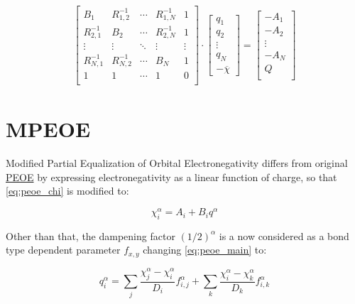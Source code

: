\documentclass[oneside]{memoir}
\newcommand\ddfrac[2]{\frac{\displaystyle #1}{\displaystyle #2}}
\begin{document}
\begin{gather}
	\label{eq:eem_system}
	\begin{bmatrix}
		B_1			    & R_{1,2}^{-1}  & \cdots	& R_{1,N}^{-1}	& 1 \\
		R_{2,1}^{-1}	& B_2			& \cdots	& R_{2,N}^{-1}	& 1 \\
		\vdots			& \vdots		& \ddots	& \vdots		& \vdots \\
		R_{N,1}^{-1}	& R_{N,2}^{-1}	& \cdots	& B_N			& 1 \\
		1			    & 1		    	& \cdots	& 1		    	& 0 \\
	\end{bmatrix}
	\cdot
	\begin{bmatrix}
		q_1 \\
		q_2 \\
		\vdots \\
		q_N \\
		-\overline{\chi}
	\end{bmatrix}
	=
	\begin{bmatrix}
		-A_1\\
		-A_2\\
		\vdots \\
		-A_N\\
		Q\\
	\end{bmatrix}
\end{gather}

\section*{MPEOE}
\label{sec:methods_mpeoe}

Modified Partial Equalization of Orbital Electronegativity \cite{No1990} differs from original \hyperref[sec:methods_peoe]{PEOE} by expressing electronegativity as a linear function of charge, so that \ref{eq:peoe_chi} is modified to:

\begin{equation}
\label{eq:mpeoe_chi}
\chi_i^\alpha = A_i + B_iq^\alpha
\end{equation}

Other than that, the dampening factor $(1/2)^\alpha$ is a now considered as a bond type dependent parameter $f_{x, y}$ changing \ref{eq:peoe_main} to:

\begin{equation}
\label{eq:mpeoe_main}
q_i^\alpha = \sum_j \ddfrac{\chi_j^\alpha - \chi_i^\alpha}{D_i}f_{i, j}^\alpha + \sum_k \ddfrac{\chi_i^\alpha - \chi_k^\alpha}{D_k}f_{i, k}^\alpha
\end{equation}
\end{document}
